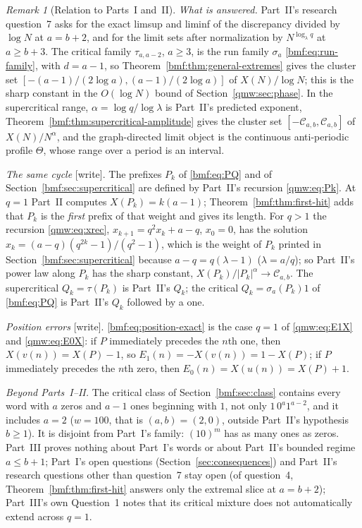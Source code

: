\documentclass[11pt]{article}
\numberwithin{equation}{section}
\theoremstyle{definition}
\theoremstyle{remark}
\newtheorem{remark}[theorem]{Remark}
\newcommand{\abs}[1]{\lvert#1\rvert}
\begin{document}
\begin{remark}[Relation to Parts~I and~II]\label{bmf:rem:partII}
\emph{What is answered.} Part~II's research question~7 asks for the exact
limsup and liminf of the discrepancy divided by $\log N$ at $a=b+2$, and
for the limit sets after normalization by $N^{\log_\lambda q}$ at
$a\geq b+3$. The critical family $\tau_{a,a-2}$, $a\geq3$, is the run
family $\sigma_a$ \eqref{bmf:eq:run-family}, with $d=a-1$, so
Theorem~\ref{bmf:thm:general-extremes} gives the cluster set
$[-(a-1)/(2\log a),(a-1)/(2\log a)]$ of $X(N)/\log N$; this is the sharp
constant in the $O(\log N)$ bound of Section~\ref{qmw:sec:phase}. In the
supercritical range, $\alpha=\log q/\log\lambda$ is Part~II's predicted
exponent, Theorem~\ref{bmf:thm:supercritical-amplitude} gives the cluster
set $[-\mathcal C_{a,b},\mathcal C_{a,b}]$ of $X(N)/N^\alpha$, and the
graph-directed limit object is the continuous anti-periodic profile
$\Theta$, whose range over a period is an interval.

\emph{The same cycle} [write]. The prefixes $P_k$ of \eqref{bmf:eq:PQ} and of
Section~\ref{bmf:sec:supercritical} are defined by Part~II's recursion
\eqref{qmw:eq:Pk}. At $q=1$ Part~II computes $X(P_k)=k(a-1)$;
Theorem~\ref{bmf:thm:first-hit} adds that $P_k$ is the \emph{first} prefix
of that weight and gives its length. For $q>1$ the recursion
\eqref{qmw:eq:xrec}, $x_{k+1}=q^2x_k+a-q$, $x_0=0$, has the solution
$x_k=(a-q)(q^{2k}-1)/(q^2-1)$, which is the weight of $P_k$ printed in
Section~\ref{bmf:sec:supercritical} because $a-q=q(\lambda-1)$
($\lambda=a/q$); so Part~II's power law along $P_k$ has the sharp constant,
$X(P_k)/\abs{P_k}^\alpha\to\mathcal C_{a,b}$. The supercritical $Q_k=\tau(P_k)$
is Part~II's $Q_k$; the critical $Q_k=\sigma_a(P_k)1$ of \eqref{bmf:eq:PQ}
is Part~II's $Q_k$ followed by a one.

\emph{Position errors} [write]. \eqref{bmf:eq:position-exact} is the case $q=1$ of
\eqref{qmw:eq:E1X} and \eqref{qmw:eq:E0X}: if $P$ immediately precedes the
$n$th one, then $X(v(n))=X(P)-1$, so $E_1(n)=-X(v(n))=1-X(P)$; if $P$
immediately precedes the $n$th zero, then $E_0(n)=X(u(n))=X(P)+1$.

\emph{Beyond Parts~I--II.} The critical class of
Section~\ref{bmf:sec:class} contains every word with $a$ zeros and $a-1$
ones beginning with $1$, not only $1\,0^a1^{a-2}$, and it includes $a=2$
($w=100$, that is $(a,b)=(2,0)$, outside Part~II's hypothesis $b\geq1$).
It is disjoint from Part~I's family: $(10)^m$ has as many ones as zeros.
Part~III proves nothing about Part~I's words or about Part~II's bounded
regime $a\leq b+1$; Part~I's open questions
(Section~\ref{sec:consequences}) and Part~II's research questions other
than question~7 stay open (of question~4, Theorem~\ref{bmf:thm:first-hit}
answers only the extremal slice at $a=b+2$); Part~III's own Question~1 notes that its critical mixture does not
automatically extend across $q=1$.


\end{remark}
\end{document}
